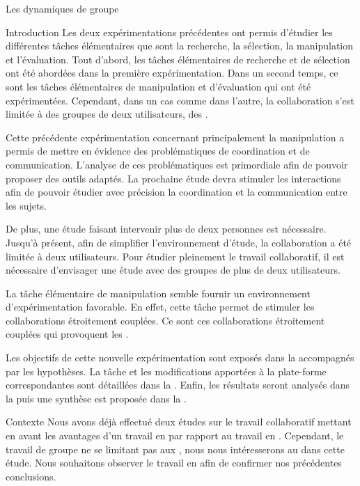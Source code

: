 \documentclass[myfrancais]{mythesis}
\begin{document}
	\begin{mychapter}{Les dynamiques de groupe}
		\begin{mysection}{Introduction}
			Les deux expérimentations précédentes ont permis d'étudier les différentes tâches élémentaires que sont la recherche, la sélection, la manipulation et l'évaluation.
			Tout d'abord, les tâches élémentaires de recherche et de sélection ont été abordées dans la première expérimentation.
			Dans un second temps, ce sont les tâches élémentaires de manipulation et d'évaluation qui ont été expérimentées.
			Cependant, dans un cas comme dans l'autre, la collaboration s'est limitée à des groupes de deux utilisateurs, des .

			Cette précédente expérimentation concernant principalement la manipulation a permis de mettre en évidence des problématiques de coordination et de communication.
			L'analyse de ces problématiques est primordiale afin de pouvoir proposer des outils adaptés.
			La prochaine étude devra stimuler les interactions afin de pouvoir étudier avec précision la coordination et la communication entre les sujets.

			De plus, une étude faisant intervenir plus de deux personnes est nécessaire.
			Jusqu'à présent, afin de simplifier l'environnement d'étude, la collaboration a été limitée à deux utilisateurs.
			Pour étudier pleinement le travail collaboratif, il est nécessaire d'envisager une étude avec des groupes de plus de deux utilisateurs.

			La tâche élémentaire de manipulation semble fournir un environnement d'expérimentation favorable.
			En effet, cette tâche permet de stimuler les collaborations étroitement couplées.
			Ce sont ces collaborations étroitement couplées qui provoquent les .

			Les objectifs de cette nouvelle expérimentation sont exposés dans la  accompagnés par les hypothèses.
			La tâche et les modifications apportées à la plate-forme correspondantes sont détaillées dans la .
			Enfin, les résultats seront analysés dans la  puis une synthèse est proposée dans la .
		\end{mysection}
		\begin{mysection}{Contexte}
			Nous avons déjà effectué deux études sur le travail collaboratif mettant en avant les avantages d'un travail en  par rapport au travail en .
			Cependant, le travail de groupe ne se limitant pas aux , nous nous intéresserons au  dans cette étude.
			Nous souhaitons observer le travail en  afin de confirmer nos précédentes conclusions.


\end{mysection}
\end{mychapter}
\end{document}
